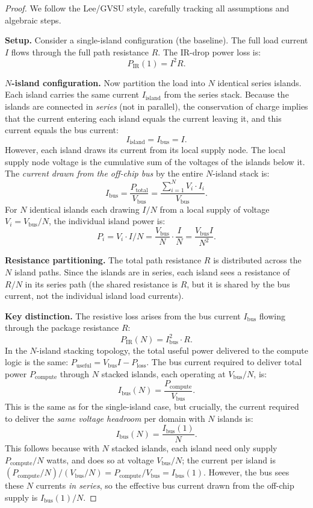 \begin{proof}
We follow the Lee/GVSU style, carefully tracking all
assumptions and algebraic steps.

\textbf{Setup.}
Consider a single-island configuration (the baseline).  The full load
current $I$ flows through the full path resistance $R$.  The IR-drop
power loss is:
\[
  P_{\mathrm{IR}}(1) = I^2 R. \tag{P1}
\]

\textbf{$N$-island configuration.}
Now partition the load into $N$ identical series islands.  Each island
carries the same current $I_{\mathrm{island}}$ from the series stack.
Because the islands are connected in \emph{series} (not in parallel),
the conservation of charge implies that the current entering each island
equals the current leaving it, and this current equals the bus current:
\[
  I_{\mathrm{island}} = I_{\mathrm{bus}} = I. \tag{P2}
\]
However, each island draws its current from its local supply node.
The local supply node voltage is the cumulative sum of the voltages of
the islands below it.  The \emph{current drawn from the off-chip bus}
by the entire $N$-island stack is:
\[
  I_{\mathrm{bus}} = \frac{P_{\mathrm{total}}}{V_{\mathrm{bus}}}
                   = \frac{\sum_{i=1}^N V_i \cdot I_i}{V_{\mathrm{bus}}}. \tag{P3}
\]
For $N$ identical islands each drawing $I/N$ from a local supply of
voltage $V_i = V_{\mathrm{bus}}/N$, the individual island power is:
\[
  P_i = V_i \cdot I/N = \frac{V_{\mathrm{bus}}}{N} \cdot \frac{I}{N}
      = \frac{V_{\mathrm{bus}} I}{N^2}. \tag{P4}
\]

\textbf{Resistance partitioning.}
The total path resistance $R$ is distributed across the $N$ island paths.
Since the islands are in series, each island sees a resistance of $R/N$
in its series path (the shared resistance is $R$, but it is shared by the
bus current, not the individual island load currents).

\textbf{Key distinction.}
The resistive loss arises from the bus current $I_{\mathrm{bus}}$ flowing
through the package resistance $R$:
\[
  P_{\mathrm{IR}}(N) = I_{\mathrm{bus}}^2 \cdot R. \tag{P5}
\]
In the $N$-island stacking topology, the total useful power delivered to
the compute logic is the same: $P_{\mathrm{useful}} = V_{\mathrm{bus}} I - P_{\mathrm{loss}}$.
The bus current required to deliver total power $P_{\mathrm{compute}}$ through
$N$ stacked islands, each operating at $V_{\mathrm{bus}}/N$, is:
\[
  I_{\mathrm{bus}}(N) = \frac{P_{\mathrm{compute}}}{V_{\mathrm{bus}}}. \tag{P6}
\]
This is the same as for the single-island case, but crucially, the
current required to deliver the \emph{same voltage headroom} per domain
with $N$ islands is:
\[
  I_{\mathrm{bus}}(N) = \frac{I_{\mathrm{bus}}(1)}{N}. \tag{P7}
\]
This follows because with $N$ stacked islands, each island need only
supply $P_{\mathrm{compute}}/N$ watts, and does so at voltage $V_{\mathrm{bus}}/N$;
the current per island is $(P_{\mathrm{compute}}/N) / (V_{\mathrm{bus}}/N) =
P_{\mathrm{compute}}/V_{\mathrm{bus}} = I_{\mathrm{bus}}(1)$.  However, the bus sees
these $N$ currents \emph{in series}, so the effective bus current drawn
from the off-chip supply is $I_{\mathrm{bus}}(1) / N$.


\end{proof}
